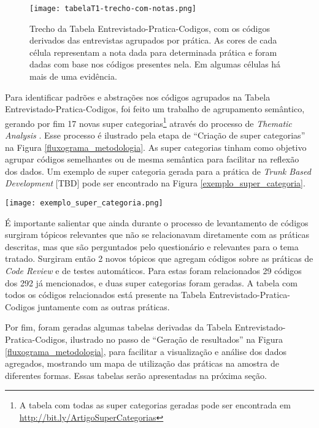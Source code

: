 \begin{figure}[ht]
    \begin{center}
    \texttt{[image: tabelaT1-trecho-com-notas.png]}
    \end{center}
    \caption[Trecho da Tabela Entrevistado-Pratica-Codigos]{
        Trecho da Tabela Entrevistado-Pratica-Codigos, com os códigos derivados das entrevistas agrupados por prática. As cores de cada célula representam a nota dada para determinada prática e foram dadas com base nos códigos presentes nela. Em algumas células há mais de uma evidência.
}\label{trecho_tabela_t1}
\end{figure}

Para identificar padrões e abstrações nos códigos agrupados na Tabela Entrevistado-Pratica-Codigos, foi feito um trabalho de agrupamento semântico, gerando por fim 17 novas super categorias\footnote{A tabela com todas as super categorias geradas pode ser encontrada em \url{http://bit.ly/ArtigoSuperCategorias}} através do processo de \emph{Thematic Analysis} \cite{groundedTheory}. Esse processo é ilustrado pela etapa de ``Criação de super categorias'' na Figura \ref{fluxograma_metodologia}. As super categorias tinham como objetivo agrupar códigos semelhantes ou de mesma semântica para facilitar na reflexão dos dados. Um exemplo de super categoria gerada para a prática de \emph{Trunk Based Development} [TBD] pode ser encontrado na Figura \ref{exemplo_super_categoria}.


\begin{figure*}[ht]
\begin{center}
\texttt{[image: exemplo\_super\_categoria.png]}
\end{center}
\caption[Exemplo de super categoria]{
    Exemplo de super categoria gerada durante o processo de \emph{Thematic Analysis}.
}\label{exemplo_super_categoria}
\end{figure*}

É importante salientar que ainda durante o processo de levantamento de códigos surgiram tópicos relevantes que não se relacionavam diretamente com as práticas descritas, mas que são perguntados pelo questionário e relevantes para o tema tratado. Surgiram então 2 novos tópicos que agregam códigos sobre as práticas de \emph{Code Review} e de testes automáticos. Para estas foram relacionados 29 códigos dos 292 já mencionados, e duas super categorias foram geradas. A tabela com todos os códigos relacionados está presente na Tabela Entrevistado-Pratica-Codigos juntamente com as outras práticas.

Por fim, foram geradas algumas tabelas derivadas da Tabela Entrevistado-Pratica-Codigos, ilustrado no passo de ``Geração de resultados'' na Figura \ref{fluxograma_metodologia}, para facilitar a visualização e análise dos dados agregados, mostrando um mapa de utilização das práticas na amostra de diferentes formas. Essas tabelas serão apresentadas na próxima seção.

